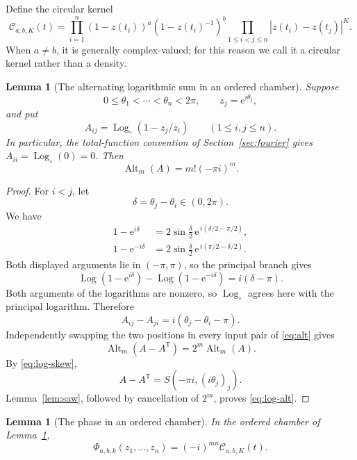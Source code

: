 \documentclass[11pt,a4paper]{article}
\newtheorem{lemma}[theorem]{Lemma}
\theoremstyle{definition}
\newcommand{\Alt}{\operatorname{Alt}}
\newcommand{\e}{\mathrm e}
\newcommand{\Logc}{\operatorname{Log}_{\circ}}
\begin{document}
Define the circular kernel
\begin{equation}\label{eq:circular-kernel}
\mathcal C_{a,b,K}(t)=
\prod_{i=1}^{n}(1-z(t_i))^a(1-z(t_i)^{-1})^b
\prod_{1\le i<j\le n}|z(t_i)-z(t_j)|^K.
\end{equation}
When $a\ne b$, it is generally complex-valued; for this reason we call it
a circular kernel rather than a density.

\begin{lemma}[The alternating logarithmic sum in an ordered chamber]
\label{lem:ordered-alt}
Suppose
\[
 0\le\theta_1<\cdots<\theta_n<2\pi,\qquad z_j=\e^{i\theta_j},
\]
and put
\[
 A_{ij}=\Logc(1-z_j/z_i)\qquad(1\le i,j\le n).
\]
In particular, the total-function convention of
Section~\ref{sec:fourier} gives $A_{ii}=\Logc(0)=0$. Then
\begin{equation}\label{eq:log-alt}
 \Alt_m(A)=m!(-\pi i)^m.
\end{equation}
\end{lemma}

\begin{proof}
For $i<j$, let
\[
 \delta=\theta_j-\theta_i\in(0,2\pi).
\]
We have
\[
\begin{aligned}
1-\e^{i\delta}
 &=2\sin\frac{\delta}{2}\,
   \e^{\,i(\delta/2-\pi/2)},\\
1-\e^{-i\delta}
 &=2\sin\frac{\delta}{2}\,
   \e^{\,i(\pi/2-\delta/2)}.
\end{aligned}
\]
Both displayed arguments lie in $(-\pi,\pi)$, so the principal branch
gives
\[
 \operatorname{Log}(1-\e^{i\delta})
 -\operatorname{Log}(1-\e^{-i\delta})
 =i(\delta-\pi).
\]
Both arguments of the logarithms are nonzero, so $\Logc$ agrees here
with the principal logarithm. Therefore
\begin{equation}\label{eq:log-skew}
 A_{ij}-A_{ji}=i(\theta_j-\theta_i-\pi).
\end{equation}
Independently swapping the two positions in every input pair of
\eqref{eq:alt} gives
\[
 \Alt_m(A-A^{\mathsf T})=2^m\Alt_m(A).
\]
By \eqref{eq:log-skew},
\[
A-A^{\mathsf T}=S(-\pi i,(i\theta_j)_j).
\]
Lemma~\ref{lem:saw}, followed by cancellation of $2^m$, proves
\eqref{eq:log-alt}.
\end{proof}

\begin{lemma}[The phase in an ordered chamber]\label{lem:ordered-phase}
In the ordered chamber of Lemma~\ref{lem:ordered-alt},
\begin{equation}\label{eq:kernel-phase}
 \Phi_{a,b,k}(z_1,\ldots,z_n)
 =(-i)^{mn}\mathcal C_{a,b,K}(t).
\end{equation}
\end{lemma}
\end{document}
